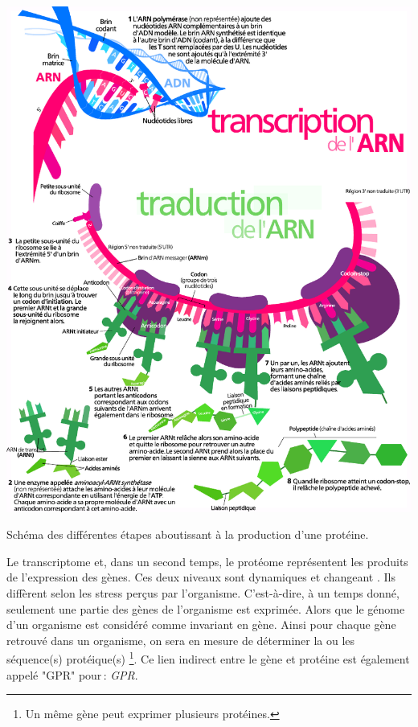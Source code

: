 \begin{refsegment}
    \begin{shadedfigure}
        \centering
        \includegraphics[width=\textwidth]{img/production_proteine2.pdf}
        \caption{Schéma des différentes étapes aboutissant à la production d’une protéine.}
        \label{fig:production_proteine}
    \end{shadedfigure}
    
    Le transcriptome et, dans un second temps, le protéome représentent les produits de l'expression des gènes. Ces deux niveaux sont dynamiques et changeant . Ils diffèrent selon les stress perçus par l'organisme. C'est-à-dire, à un temps donné, seulement une partie des gènes de l'organisme est exprimée. Alors que le génome d'un organisme est considéré comme invariant en gène. Ainsi pour chaque gène retrouvé dans un organisme, on sera en mesure de déterminer la ou les séquence(s) protéique(s) \footnote{Un même gène peut exprimer plusieurs protéines.}. Ce lien indirect entre le gène et protéine est également appelé "\acrshort{GPR}" pour : \textit{\acrfull{GPR}}.
    

\end{refsegment}
